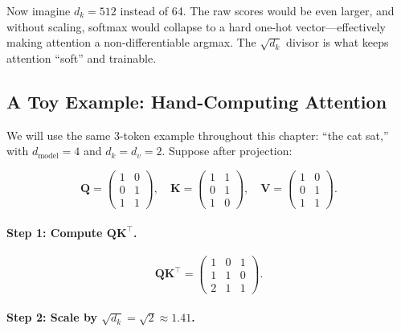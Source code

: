 Now imagine $d_k = 512$ instead of 64. The raw scores would be even larger, and without scaling, softmax would collapse to a hard one-hot vector---effectively making attention a non-differentiable argmax. The $\sqrt{d_k}$ divisor is what keeps attention ``soft'' and trainable.

\medskip
\noindent{}
\medskip

\subsection{A Toy Example: Hand-Computing Attention}

We will use the same 3-token example throughout this chapter: ``the cat sat,'' with $d_{\text{model}} = 4$ and $d_k = d_v = 2$. Suppose after projection:

\[
\mathbf{Q} = \begin{pmatrix} 1 & 0 \\ 0 & 1 \\ 1 & 1 \end{pmatrix}, \quad
\mathbf{K} = \begin{pmatrix} 1 & 1 \\ 0 & 1 \\ 1 & 0 \end{pmatrix}, \quad
\mathbf{V} = \begin{pmatrix} 1 & 0 \\ 0 & 1 \\ 1 & 1 \end{pmatrix}.
\]

\paragraph{Step 1: Compute $\mathbf{Q}\mathbf{K}^\top$.}

\[
\mathbf{Q}\mathbf{K}^\top = \begin{pmatrix} 1 & 0 & 1 \\ 1 & 1 & 0 \\ 2 & 1 & 1 \end{pmatrix}.
\]

\paragraph{Step 2: Scale by $\sqrt{d_k} = \sqrt{2} \approx 1.41$.}

